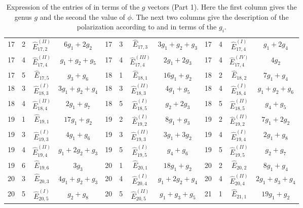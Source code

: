 \documentclass[a4paper,11pt]{article}
\begin{document}
\begin{table}
\begin{center}
{\begin{tabular}{|cccc|cccc|cccc|}
17  &  2  &  $\widehat{E}_{17,2}^{(II)}$  &  $6g_{1}+2g_{2}$    &    17  &  3  &  $\widehat{E}_{17,3}$  &  $3g_{1}+g_{2}+g_{3}$    &    17  &  4  &  $\widehat{E}_{17,4}^{(I)}$  &  $g_{1}+2g_{4}$\\
17  &  4  &  $\widehat{E}_{17,4}^{(II)}$  &  $g_{1}+g_{2}+g_{5}$    &    17  &  4  &  $\widehat{E}_{17,4}^{(III)}$  &  $2g_{1}+2g_{3}$    &    17  &  4  &  $\widehat{E}_{17,4}^{(IV)}$  &  $4g_{2}$\\
17  &  5  &  $\widehat{E}_{17,5}$  &  $g_{3}+g_{6}$    &    18  &  1  &  $\widehat{E}_{18,1}$  &  $16g_{1}+g_{2}$    &    18  &  2  &  $\widehat{E}_{18,2}$  &  $7g_{1}+g_{4}$\\
18  &  3  &  $\widehat{E}_{18,3}^{(I)}$  &  $3g_{1}+g_{2}+g_{4}$    &    18  &  3  &  $\widehat{E}_{18,3}^{(II)}$  &  $4g_{1}+g_{5}$    &    18  &  4  &  $\widehat{E}_{18,4}^{(I)}$  &  $g_{1}+g_{2}+g_{6}$\\
18  &  4  &  $\widehat{E}_{18,4}^{(II)}$  &  $2g_{1}+g_{7}$    &    18  &  5  &  $\widehat{E}_{18,5}^{(I)}$  &  $g_{2}+2g_{3}$    &    18  &  5  &  $\widehat{E}_{18,5}^{(II)}$  &  $g_{4}+g_{5}$\\
19  &  1  &  $\widehat{E}_{19,1}$  &  $17g_{1}+g_{2}$    &    19  &  2  &  $\widehat{E}_{19,2}^{(I)}$  &  $8g_{1}+g_{3}$    &    19  &  2  &  $\widehat{E}_{19,2}^{(II)}$  &  $7g_{1}+2g_{2}$\\
19  &  3  &  $\widehat{E}_{19,3}^{(I)}$  &  $4g_{1}+g_{6}$    &    19  &  3  &  $\widehat{E}_{19,3}^{(II)}$  &  $3g_{1}+3g_{2}$    &    19  &  4  &  $\widehat{E}_{19,4}^{(I)}$  &  $2g_{1}+g_{8}$\\
19  &  4  &  $\widehat{E}_{19,4}^{(II)}$  &  $g_{1}+2g_{2}+g_{3}$    &    19  &  5  &  $\widehat{E}_{19,5}^{(I)}$  &  $g_{4}+g_{6}$    &    19  &  5  &  $\widehat{E}_{19,5}^{(II)}$  &  $g_{2}+g_{7}$\\
19  &  6  &  $\widehat{E}_{19,6}$  &  $3g_{3}$    &    20  &  1  &  $\widehat{E}_{20,1}$  &  $18g_{1}+g_{2}$    &    20  &  2  &  $\widehat{E}_{20,2}$  &  $8g_{1}+g_{4}$\\
20  &  3  &  $\widehat{E}_{20,3}$  &  $4g_{1}+g_{2}+g_{3}$    &    20  &  4  &  $\widehat{E}_{20,4}^{(I)}$  &  $g_{1}+2g_{2}+g_{4}$    &    20  &  4  &  $\widehat{E}_{20,4}^{(II)}$  &  $2g_{1}+g_{3}+g_{4}$\\
20  &  5  &  $\widehat{E}_{20,5}^{(I)}$  &  $g_{2}+g_{8}$    &    20  &  5  &  $\widehat{E}_{20,5}^{(II)}$  &  $g_{1}+g_{3}+g_{5}$    &    21  &  1  &  $\widehat{E}_{21,1}$  &  $19g_{1}+g_{2}$\\
\hline
\end{tabular}
}
\caption{Expression of the entries of \cite[Appendix]{CDGK} in terms of the $g$ vectors (Part 1). Here the first column gives the genus $g$ and the second the value of $\phi$. The next two columns give the description of the polarization according to \cite{CDGK} and in terms of the $g_i$. }
\label{Expression_Isotropic_Vectors_Part1}
\end{center}
\end{table}
\end{document}
